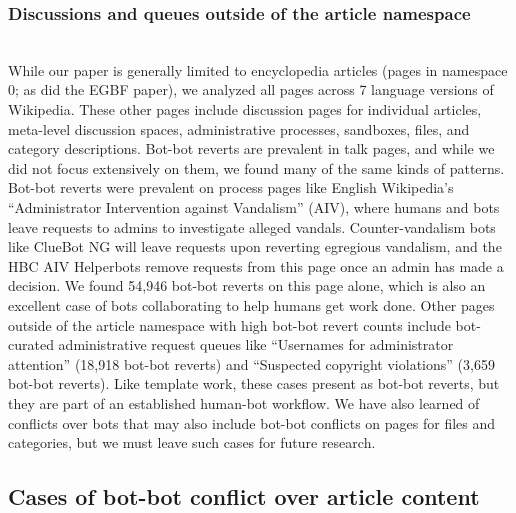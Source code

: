 \documentclass[format=acmsmall, review=false, screen=true]{acmart}%
\begin{document}
\subsubsection{Discussions and queues outside of the article namespace} \label{s:qualdesc:talkpages}
~\\
While our paper is generally limited to encyclopedia articles (pages in namespace 0; as did the EGBF paper), we analyzed all pages across 7 language versions of Wikipedia. These other pages include discussion pages for individual articles, meta-level discussion spaces, administrative processes, sandboxes, files, and category descriptions. Bot-bot reverts are prevalent in talk pages, and while we did not focus extensively on them, we found many of the same kinds of patterns. Bot-bot reverts were prevalent on process pages like English Wikipedia's ``Administrator Intervention against Vandalism'' (AIV), where humans and bots leave requests to admins to investigate alleged vandals. Counter-vandalism bots like ClueBot NG will leave requests upon reverting egregious vandalism, and the HBC AIV Helperbots remove requests from this page once an admin has made a decision. We found 54,946 bot-bot reverts on this page alone, which is also an excellent case of bots collaborating to help humans get work done. Other pages outside of the article namespace with high bot-bot revert counts include bot-curated administrative request queues like ``Usernames for administrator attention'' (18,918 bot-bot reverts) and ``Suspected copyright violations'' (3,659 bot-bot reverts). Like template work, these cases present as bot-bot reverts, but they are part of an established human-bot workflow. We have also learned of conflicts over bots that may also include bot-bot conflicts on pages for files and categories, but we must leave such cases for future research.

\subsection{Cases of bot-bot conflict over article content}  
\end{document}
